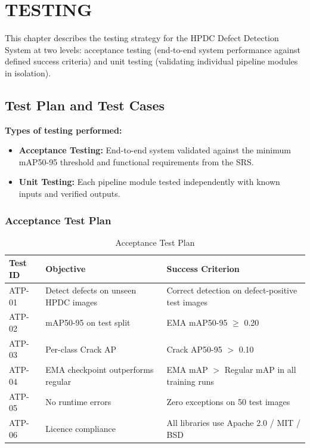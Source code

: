 \chapter{TESTING}

\justify

This chapter describes the testing strategy for the HPDC Defect Detection System at two levels: acceptance testing (end-to-end system performance against defined success criteria) and unit testing (validating individual pipeline modules in isolation).

\section{Test Plan and Test Cases}

\textbf{Types of testing performed:}
\begin{itemize}[leftmargin=2em]
    \item \textbf{Acceptance Testing:} End-to-end system validated against the minimum mAP50-95 threshold and functional requirements from the SRS.
    \item \textbf{Unit Testing:} Each pipeline module tested independently with known inputs and verified outputs.
\end{itemize}

\subsection*{Acceptance Test Plan}

\begin{table}[H]
\centering
\caption{Acceptance Test Plan}
\begin{tabular}{l p{6cm} p{4.5cm}}
\toprule
\rowcolor{tableHeader}
{\color{white}\bfseries Test ID} &
{\color{white}\bfseries Objective} &
{\color{white}\bfseries Success Criterion} \\
\midrule
ATP-01 & Detect defects on unseen HPDC images & Correct detection on defect-positive test images \\
\rowcolor{tableRowAlt}
ATP-02 & mAP50-95 on test split & EMA mAP50-95 $\geq$ 0.20 \\
ATP-03 & Per-class Crack AP & Crack AP50-95 $>$ 0.10 \\
\rowcolor{tableRowAlt}
ATP-04 & EMA checkpoint outperforms regular & EMA mAP $>$ Regular mAP in all training runs \\
ATP-05 & No runtime errors & Zero exceptions on 50 test images \\
\rowcolor{tableRowAlt}
ATP-06 & Licence compliance & All libraries use Apache 2.0 / MIT / BSD \\
\bottomrule
\end{tabular}
\end{table}

